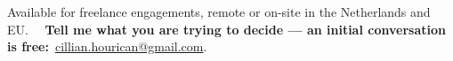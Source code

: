 \documentclass[10pt]{article}
\begin{document}
\enlargethispage{2.5\baselineskip}
\vspace{3pt}
{\RaggedRight\small\color{cvmuted}Available for freelance engagements, remote or on-site in the Netherlands and EU. \ \ {\headfont\bfseries\color{cvpop}Tell me what you are trying to decide --- an initial conversation is free:}\ \href{mailto:cillian.hourican@gmail.com}{\color{cvteal}cillian.hourican@gmail.com}.\par}
\end{document}

